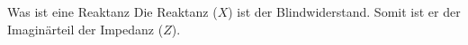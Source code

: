 
\begin{karte}{Was ist eine Reaktanz}
	Die Reaktanz ($X$) ist der Blindwiderstand. Somit ist er der Imaginärteil der Impedanz ($Z$). 
\end{karte}